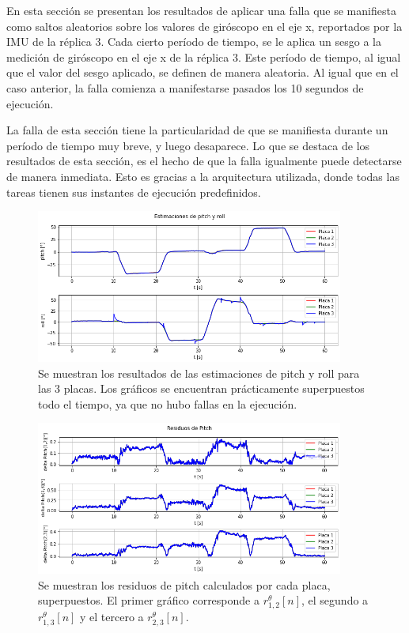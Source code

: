 En esta sección se presentan los resultados de aplicar una falla que se manifiesta como saltos aleatorios sobre los valores de giróscopo en el eje x, reportados por la IMU de la réplica 3. Cada cierto período de tiempo, se le aplica un sesgo a la medición de giróscopo en el eje x de la réplica 3. Este período de tiempo, al igual que el valor del sesgo aplicado, se definen de manera aleatoria. Al igual que en el caso anterior, la falla comienza a manifestarse pasados los 10 segundos de ejecución.

La falla de esta sección tiene la particularidad de que se manifiesta durante un período de tiempo muy breve, y luego desaparece. Lo que se destaca de los resultados de esta sección, es el hecho de que la falla igualmente puede detectarse de manera inmediata. Esto es gracias a la arquitectura utilizada, donde todas las tareas tienen sus instantes de ejecución predefinidos.

\begin{figure}[H]
    \centering
    \includegraphics[width=0.9\textwidth]{img/resultados_pitch_roll_saltos_aleatorios.png}
    \caption{Se muestran los resultados de las estimaciones de pitch y roll para las 3 placas. Los gráficos se encuentran prácticamente superpuestos todo el tiempo, ya que no hubo fallas en la ejecución.}
    \label{fig:resultados_pitch_roll_saltos_aleatorios}
\end{figure}

\begin{figure}[H]
    \centering
    \includegraphics[width=0.9\textwidth]{img/resultados_residuos_pitch_saltos_aleatorios.png}
    \caption{Se muestran los residuos de pitch calculados por cada placa, superpuestos. El primer gráfico corresponde a $r_{1,2}^{\theta}[n]$, el segundo a $r_{1,3}^{\theta}[n]$ y el tercero a $r_{2,3}^{\theta}[n]$.}
    \label{fig:resultados_residuos_pitch_saltos_aleatorios}
\end{figure}

